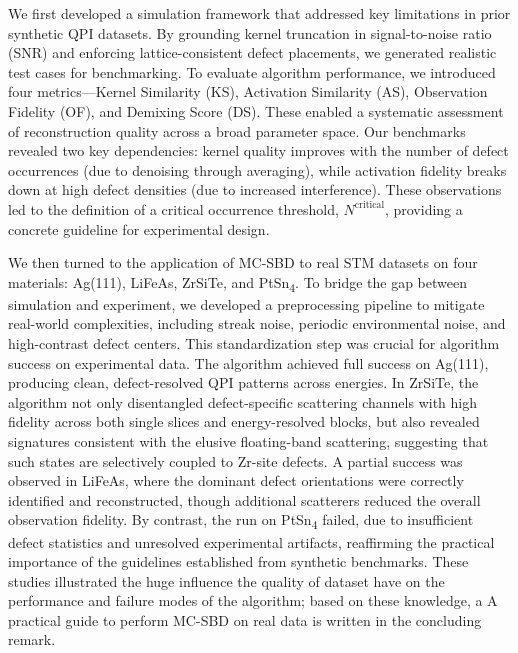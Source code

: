 We first developed a simulation framework that addressed key limitations in prior synthetic QPI datasets. By grounding kernel truncation in signal-to-noise ratio (SNR) and enforcing lattice-consistent defect placements, we generated realistic test cases for benchmarking. To evaluate algorithm performance, we introduced four metrics—Kernel Similarity (KS), Activation Similarity (AS), Observation Fidelity (OF), and Demixing Score (DS). These enabled a systematic assessment of reconstruction quality across a broad parameter space. Our benchmarks revealed two key dependencies: kernel quality improves with the number of defect occurrences (due to denoising through averaging), while activation fidelity breaks down at high defect densities (due to increased interference). These observations led to the definition of a critical occurrence threshold, $N^{\text{critical}}$, providing a concrete guideline for experimental design. 

We then turned to the application of \ac{MC-SBD} to real STM datasets on four materials: Ag(111), LiFeAs, ZrSiTe, and PtSn\textsubscript{4}. To bridge the gap between simulation and experiment, we developed a preprocessing pipeline to mitigate real-world complexities, including streak noise, periodic environmental noise, and high-contrast defect centers. This standardization step was crucial for algorithm success on experimental data. The algorithm achieved full success on Ag(111), producing clean, defect-resolved QPI patterns across energies. In ZrSiTe, the algorithm not only disentangled defect-specific scattering channels with high fidelity across both single slices and energy-resolved blocks, but also revealed signatures consistent with the elusive floating-band scattering, suggesting that such states are selectively coupled to Zr-site defects. A partial success was observed in LiFeAs, where the dominant defect orientations were correctly identified and reconstructed, though additional scatterers reduced the overall observation fidelity. By contrast, the run on PtSn\textsubscript{4} failed, due to insufficient defect statistics and unresolved experimental artifacts, reaffirming the practical importance of the guidelines established from synthetic benchmarks. These studies illustrated the huge influence the quality of dataset have on the performance and failure modes of the algorithm; based on these knowledge, a A practical guide to perform MC-SBD on real data is written in the concluding remark. 